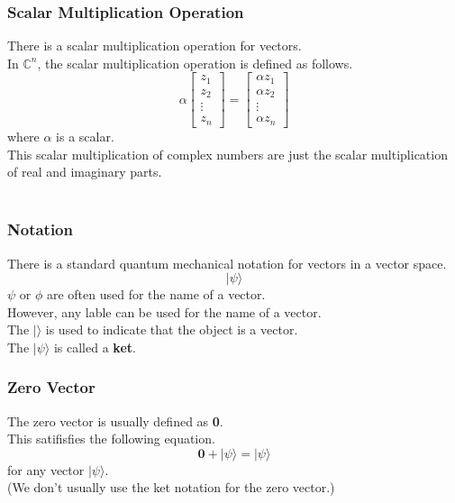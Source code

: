 \documentclass{article}
\begin{document}
\subsubsection{Scalar Multiplication Operation}
There is a scalar multiplication operation for vectors. \\
In $\mathbb{C}^n$, the scalar multiplication operation is defined as follows. \\
\begin{equation}
\alpha
\begin{bmatrix}
z_1 \\
z_2 \\
\vdots \\
z_n
\end{bmatrix}
=
\begin{bmatrix}
\alpha z_1 \\
\alpha z_2 \\
\vdots \\
\alpha z_n
\end{bmatrix}
\end{equation}
where $\alpha$ is a scalar. \\
This scalar multiplication of complex numbers are just the scalar multiplication of real and imaginary parts. \\
\\
\subsubsection{Notation}
There is a standard quantum mechanical notation for vectors in a vector space.
\begin{equation}
|\psi\rangle
\end{equation}
$\psi$ or $\phi$ are often used for the name of a vector. \\
However, any lable can be used for the name of a vector. \\
The $|\rangle$ is used to indicate that the object is a vector. \\
The $|\psi\rangle$ is called a \textbf{ket}. \\
\subsubsection{Zero Vector}
The zero vector is usually defined as \textbf{0}. \\
This satifisfies the following equation. \\
\begin{equation}
\textbf{0} + |\psi\rangle = |\psi\rangle
\end{equation}
for any vector $|\psi\rangle$. \\
(We don't usually use the ket notation for the zero vector.) \\
\end{document}
